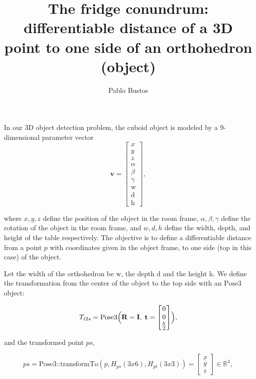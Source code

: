 \documentclass[11pt]{article}
\begin{document}
\title{The fridge conundrum: differentiable distance of a 3D point to one side of an orthohedron (object)}
\author{Pablo Bustos}
\maketitle

    In our 3D object detection problem, the cuboid object is modeled by a 9-dimensional parameter vector
    \begin{equation}
        \mathbf{v} = \begin{bmatrix} x \\ y \\ z \\ \alpha \\ \beta \\ \gamma \\ \text{w} \\ \text{d} \\ \text{h} \end{bmatrix},\label{eq:equation_1}
    \end{equation}

    where $x,y,z$ define the position of the object in the room frame, $\alpha,\beta,\gamma$ define the rotation of the object in the room frame, and $w,d,h$ define the width, depth, and height of the table respectively.
    The objective is to define a differentiable distance from a point $p$ with coordinates given in the object frame, to one side (top in this case) of the object.

    Let the width of the orthohedron be \(\text{w}\), the depth \(\text{d}\) and the height \(\text{h}\).
    We define the transformation from the center of the object to the top side with an \(\text{Pose3}\) object:

    \begin{equation}
        T_{t2s} = \text{Pose3}\Bigl(\mathbf{R}=\mathbf{I},\; \mathbf{t} = \begin{bmatrix} 0 \\  0 \\ \frac{h}{2} \end{bmatrix}\Bigr),
    \end{equation}

    and the transformed point $ps$,

    \begin{equation}
        ps = \text{Pose3::transformTo}(p,H_{ps}(3x6), H_{pt}(3x3)) = \begin{bmatrix} x \\ y \\ z \end{bmatrix} \in \mathbb{R}^3,
    \end{equation}
\end{document}
